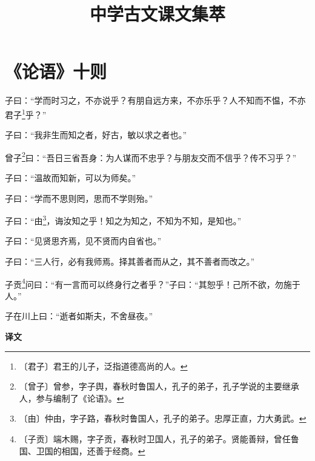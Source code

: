 \documentclass[12pt,UTF-8,openany,a4]{ctexbook}
\title{\zihao{0} \bfseries 中学古文课文集萃}
\author{}
\date{}
\begin{document}
\maketitle
\tableofcontents
\newpage

\chapter{《论语》十则}

\begin{large}
    
    子曰：“学而时习之，不亦说乎？有朋自远方来，不亦乐乎？人不知而不愠，不亦君子\footnote{〔君子〕\yiwen 君王的儿子，泛指道德高尚的人。}乎？”
    
    子曰：“我非生而知之者，好古，敏以求之者也。”
    
    曾子\footnote{〔曾子〕\yiwen 曾参，字子舆，春秋时鲁国人，孔子的弟子，孔子学说的主要继承人，参与编制了《论语》。}曰：“吾日三省吾身：为人谋而不忠乎？与朋友交而不信乎？传不习乎？”
    
    子曰：“温故而知新，可以为师矣。”
    
    子曰：“学而不思则罔，思而不学则殆。”
    
    子曰：“由\footnote{〔由〕\yiwen 仲由，字子路，春秋时鲁国人，孔子的弟子。忠厚正直，力大勇武。}，诲汝知之乎！知之为知之，不知为不知，是知也。”
    
    子曰：“见贤思齐焉，见不贤而内自省也。”
    
    子曰：“三人行，必有我师焉。择其善者而从之，其不善者而改之。”
    
    子贡\footnote{〔子贡〕\yiwen 端木赐，字子贡，春秋时卫国人，孔子的弟子。贤能善辩，曾任鲁国、卫国的相国，还善于经商。}问曰：“有一言而可以终身行之者乎？”子曰：“其恕乎！己所不欲，勿施于人。”
    
    子在川上曰：“逝者如斯夫，不舍昼夜。”
\end{large}


\newpage

\begin{Large}
    \noindent\textbf{译文}
\end{Large}


\vspace{1em}
\end{document}
